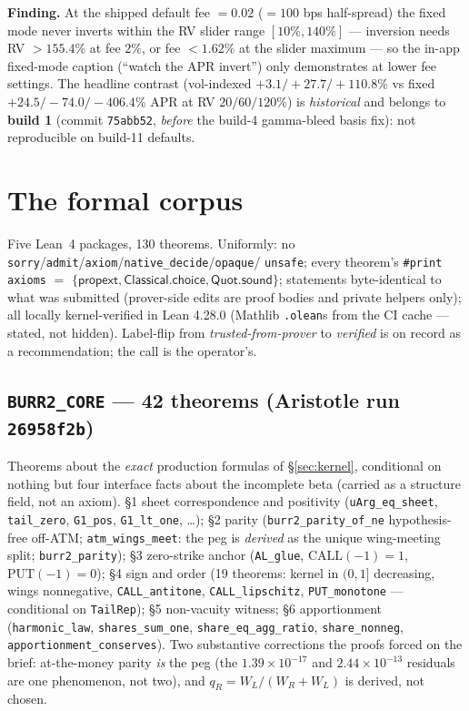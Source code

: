 \documentclass[11pt]{article}
\begin{document}
\noindent\textbf{Finding.} At the shipped default fee $=0.02$ ($=100$ bps half-spread) the
fixed mode never inverts within the RV slider range $[10\%,140\%]$ --- inversion needs
RV $>155.4\%$ at fee $2\%$, or fee $<1.62\%$ at the slider maximum --- so the in-app fixed-mode
caption (``watch the APR invert'') only demonstrates at lower fee settings. The headline
contrast (vol-indexed $+3.1/+27.7/+110.8\%$ vs fixed $+24.5/-74.0/-406.4\%$ APR at RV
$20/60/120\%$) is \emph{historical} and belongs to \textbf{build 1} (commit \texttt{75abb52},
\emph{before} the build-4 gamma-bleed basis fix): not reproducible on build-11 defaults.

\section{The formal corpus}\label{sec:lean}

Five Lean~4 packages, 130 theorems. Uniformly: no
\texttt{sorry}/\texttt{admit}/\texttt{axiom}/\texttt{native\_decide}/\texttt{opaque}/%
\texttt{unsafe}; every theorem's \texttt{\#print axioms} $=$
$\{\mathsf{propext},\mathsf{Classical.choice},\mathsf{Quot.sound}\}$; statements byte-identical
to what was submitted (prover-side edits are proof bodies and private helpers only); all
locally kernel-verified in Lean 4.28.0 (Mathlib \texttt{.olean}s from the CI cache --- stated,
not hidden). Label-flip from \emph{trusted-from-prover} to \emph{verified} is on record as a
recommendation; the call is the operator's.

\subsection{\texttt{BURR2\_CORE} --- 42 theorems (Aristotle run \texttt{26958f2b})}
Theorems about the \emph{exact} production formulas of \S\ref{sec:kernel}, conditional on
nothing but four interface facts about the incomplete beta (carried as a structure field, not an
axiom). \S1 sheet correspondence and positivity (\texttt{uArg\_eq\_sheet},
\texttt{tail\_zero}, \texttt{G1\_pos}, \texttt{G1\_lt\_one}, \dots); \S2 parity
(\texttt{burr2\_parity\_of\_ne} hypothesis-free off-ATM; \texttt{atm\_wings\_meet}: the peg is
\emph{derived} as the unique wing-meeting split; \texttt{burr2\_parity}); \S3 zero-strike
anchor (\texttt{AL\_glue}, $\mathrm{CALL}(-1)=1$, $\mathrm{PUT}(-1)=0$); \S4 sign and order
(19 theorems: kernel in $(0,1]$ decreasing, wings nonnegative, \texttt{CALL\_antitone},
\texttt{CALL\_lipschitz}, \texttt{PUT\_monotone} --- conditional on \texttt{TailRep}); \S5
non-vacuity witness; \S6 apportionment (\texttt{harmonic\_law}, \texttt{shares\_sum\_one},
\texttt{share\_eq\_agg\_ratio}, \texttt{share\_nonneg}, \texttt{apportionment\_conserves}).
Two substantive corrections the proofs forced on the brief: at-the-money parity \emph{is} the
peg (the $1.39\times10^{-17}$ and $2.44\times10^{-13}$ residuals are one phenomenon, not two),
and $q_R = W_L/(W_R{+}W_L)$ is derived, not chosen.
\end{document}
